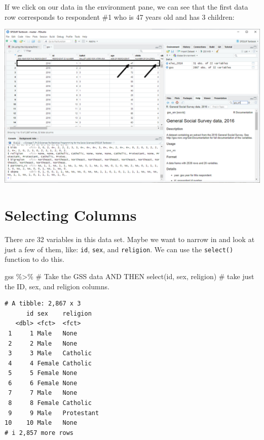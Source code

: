 \documentclass[
  letterpaper,
]{book}
\newenvironment{Shaded}{\begin{snugshade}}{\end{snugshade}}
\newcommand{\CommentTok}[1]{\textcolor[rgb]{0.37,0.37,0.37}{#1}}
\newcommand{\FunctionTok}[1]{\textcolor[rgb]{0.28,0.35,0.67}{#1}}
\newcommand{\NormalTok}[1]{\textcolor[rgb]{0.00,0.23,0.31}{#1}}
\newcommand{\SpecialCharTok}[1]{\textcolor[rgb]{0.37,0.37,0.37}{#1}}
\begin{document}
If we click on our data in the environment pane, we can see that the
first data row corresponds to respondent \#1 who is 47 years old and has
3 children:

\includegraphics{images/GSS_Respondent-1.png}

\hypertarget{selecting-columns}{%
\section{Selecting Columns}\label{selecting-columns}}

There are 32 variables in this data set. Maybe we want to narrow in and
look at just a few of them, like: \texttt{id}, \texttt{sex}, and
\texttt{religion}. We can use the \texttt{select()} function to do this.

\begin{Shaded}
\begin{Highlighting}[]
\NormalTok{gss }\SpecialCharTok{\%\textgreater{}\%}                             \CommentTok{\# Take the GSS data AND THEN}
  \FunctionTok{select}\NormalTok{(id, sex, religion)         }\CommentTok{\# take just the ID, sex, and religion columns.}
\end{Highlighting}
\end{Shaded}

\begin{verbatim}
# A tibble: 2,867 x 3
      id sex    religion  
   <dbl> <fct>  <fct>     
 1     1 Male   None      
 2     2 Male   None      
 3     3 Male   Catholic  
 4     4 Female Catholic  
 5     5 Female None      
 6     6 Female None      
 7     7 Male   None      
 8     8 Female Catholic  
 9     9 Male   Protestant
10    10 Male   None      
# i 2,857 more rows
\end{verbatim}
\end{document}
